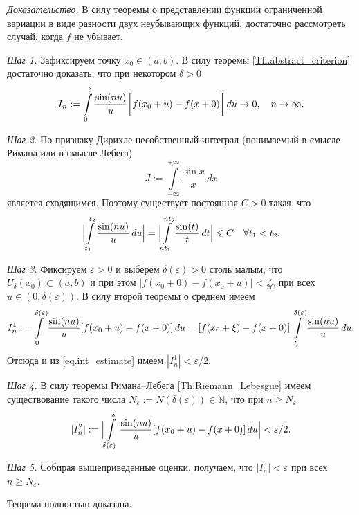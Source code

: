 \textit{Доказательство.}
В силу теоремы о представлении функции ограниченной вариации в виде разности двух неубывающих функций, достаточно рассмотреть случай, когда $f$ не убывает.

\textit{Шаг 1.} Зафиксируем точку $x_{0} \in (a,b)$.
В силу теоремы \ref{Th.abstract_criterion} достаточно доказать, что при некотором $\delta > 0$
\begin{equation}
	\notag
	I_{n}:=\int\limits_{0}^{\delta}\frac{\sin(nu)}{u}\bigg[f(x_{0}+u)-f(x+0)\bigg]\,du \to 0, \quad n \to \infty.
\end{equation}


\textit{Шаг 2.} По признаку Дирихле несобственный интеграл (понимаемый в смысле Римана или в смысле Лебега)
$$
J:=\int\limits_{-\infty}^{+\infty}\frac{\sin x}{x}\,dx
$$
является сходящимся.
Поэтому существует постоянная $C > 0$ такая, что
\begin{equation}
	\label{eq.int_estimate}
	\Bigl|\int\limits_{t_{1}}^{t_{2}}\frac{\sin(nu)}{u}\,du\Bigr| = \Bigl|\int\limits_{nt_{1}}^{nt_{2}}\frac{\sin(t)}{t}\,dt\Bigr| \le C \quad \forall t_{1} < t_{2}.
\end{equation}

\textit{Шаг 3.} Фиксируем $\varepsilon > 0$ и выберем $\delta(\varepsilon) > 0$ столь малым, что $U_{\delta}(x_{0}) \subset (a,b)$ и при этом $|f(x_{0}+0)-f(x_{0}+u)| < \frac{\varepsilon}{2C}$
при всех $u \in (0,\delta(\varepsilon))$.
В силу второй теоремы о среднем имеем
\begin{equation}
	\notag
	I^{1}_{n}:=\int\limits_{0}^{\delta(\varepsilon)}\frac{\sin(nu)}{u}[f(x_{0}+u)-f(x+0)]\,du =
	[f(x_{0}+\xi)-f(x+0)]\int\limits_{\xi}^{\delta(\varepsilon)}\frac{\sin(nu)}{u}\,du.
\end{equation}
Отсюда и из \eqref{eq.int_estimate} имеем $|I_{n}^{1}| < \varepsilon/2$.


\textit{Шаг 4.} 
В силу теоремы Римана--Лебега \ref{Th.Riemann_Lebesgue} имеем существование такого числа $N_{\varepsilon}:=N(\delta(\varepsilon)) \in \mathbb{N}$, что при $n \geq N_{\varepsilon}$
\begin{equation}
	\notag
	|I_{n}^{2}|:=\Bigl|\int\limits_{\delta(\varepsilon)}^{\delta}\frac{\sin(nu)}{u}[f(x_{0}+u)-f(x+0)]\,du\Bigr| < \varepsilon/2.
\end{equation}

\textit{Шаг 5.} Собирая вышеприведенные оценки, получаем, что $|I_{n}| < \varepsilon$ при всех $n \geq N_{\varepsilon}$.

Теорема полностью доказана.

